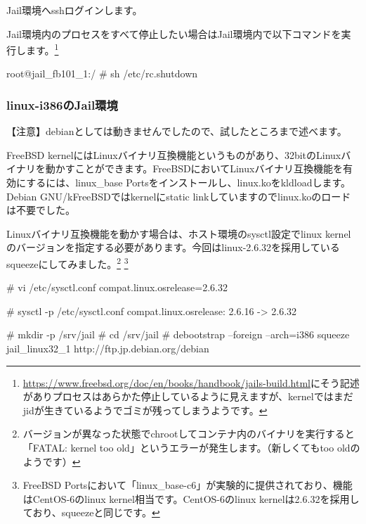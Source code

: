 \documentclass[mingoth,a4paper]{jsarticle}
\begin{document}
Jail環境へsshログインします。


Jail環境内のプロセスをすべて停止したい場合はJail環境内で以下コマンドを実行します。\footnote{\url{https://www.freebsd.org/doc/en/books/handbook/jails-build.html}にそう記述がありプロセスはあらかた停止しているように見えますが、kernelではまだjidが生きているようでゴミが残ってしまうようです。}

\begin{commandline}
root@jail_fb101_1:/ # sh /etc/rc.shutdown
\end{commandline}


\subsubsection{linux-i386のJail環境}

【注意】debianとしては動きませんでしたので、試したところまで述べます。


FreeBSD kernelにはLinuxバイナリ互換機能というものがあり、32bitのLinuxバイナリを動かすことができます。FreeBSDにおいてLinuxバイナリ互換機能を有効にするには、linux\_base Portsをインストールし、linux.koをkldloadします。Debian GNU/kFreeBSDではkernelにstatic linkしていますのでlinux.koのロードは不要でした。

Linuxバイナリ互換機能を動かす場合は、ホスト環境のsysctl設定でlinux kernelのバージョンを指定する必要があります。今回はlinux-2.6.32を採用しているsqueezeにしてみました。\footnote{バージョンが異なった状態でchrootしてコンテナ内のバイナリを実行すると「FATAL: kernel too old」というエラーが発生します。（新しくてもtoo oldのようです）} \footnote{FreeBSD Portsにおいて「linux\_base-c6」が実験的に提供されており、機能はCentOS-6のlinux kernel相当です。CentOS-6のlinux kernelは2.6.32を採用しており、squeezeと同じです。}

\begin{commandline}
# vi /etc/sysctl.conf
compat.linux.osrelease=2.6.32

# sysctl -p /etc/sysctl.conf
compat.linux.osrelease: 2.6.16 -> 2.6.32
\end{commandline}


\begin{commandline}
# mkdir -p /srv/jail
# cd /srv/jail
# debootstrap --foreign --arch=i386 squeeze jail_linux32_1 http://ftp.jp.debian.org/debian
\end{commandline}
\end{document}
